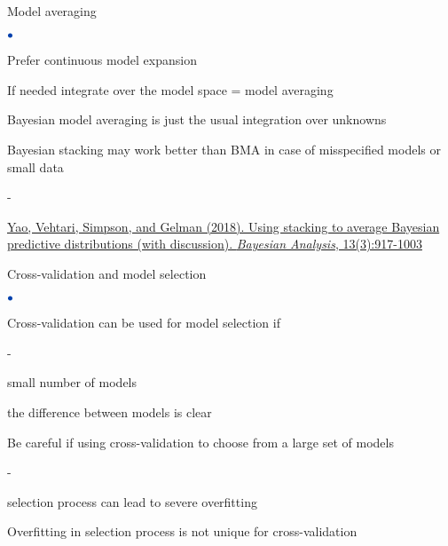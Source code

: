 \documentclass[english,t]{beamer}
\newenvironment{list1}{
   \begin{list}{$\color{list1}\bullet$}{\itemsep=6pt}}{
  \end{list}}
\newenvironment{list2}{
  \begin{list}{-}{\baselineskip=12pt\itemsep=2pt}}{
  \end{list}}
\begin{document}

\begin{frame}{Model averaging}
  
  \begin{list1}
  \item<+-> Prefer continuous model expansion
  \item<+-> If needed integrate over the model space = model averaging
  \item<+-> Bayesian model averaging is just the usual integration
    over unknowns
  \item<+-> Bayesian stacking may work better than BMA in case of
    misspecified models or small data
    \begin{list2}
    \item \href{https://projecteuclid.org/euclid.ba/1516093227}{Yao, Vehtari, Simpson, and Gelman (2018). Using stacking to average Bayesian predictive distributions (with discussion). \textit{Bayesian Analysis}, 13(3):917-1003}
    \end{list2}
  \end{list1}
  
\end{frame}

\begin{frame}{ Cross-validation and model selection}

  \begin{list1}
  \item<1-> Cross-validation can be used for model selection if
    \begin{list2}
      \item small number of models
      \item the difference between models is clear
    \end{list2}
  \item<2-> Be careful if using cross-validation to choose from a large set of models
    \begin{list2}
    \item selection process can lead to severe overfitting
    \end{list2}
  \item<3-> Overfitting in selection process is not unique for cross-validation
  \end{list1}
\end{frame}
\end{document}

